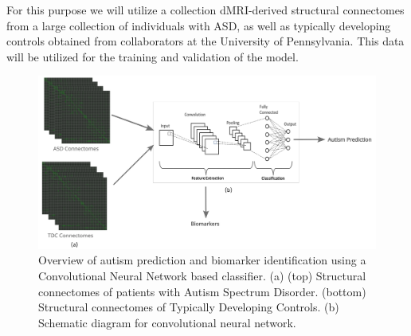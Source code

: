 \documentclass[conference]{IEEEtran}
\begin{document}
    For this purpose we will utilize a collection dMRI-derived structural connectomes 
    from a large collection of individuals with ASD, as well as typically developing 
    controls obtained from collaborators at the University of Pennsylvania. This data 
    will be utilized for the training and validation of the model.

    \begin{figure}[ht]
        \vskip 0.2in
        \begin{center}
            \centerline{\includegraphics[width=\columnwidth]{../img/project_schematic_v1.png}}
            \caption{
                Overview of autism prediction and biomarker identification using a 
                Convolutional Neural Network based classifier. (a) (top) Structural 
                connectomes of patients with Autism Spectrum Disorder. (bottom) Structural 
                connectomes of Typically Developing Controls. (b) Schematic diagram for 
                convolutional neural network.
            }
            \label{project-schematic}
        \end{center}
        \vskip -0.2in
    \end{figure}

\end{document}
